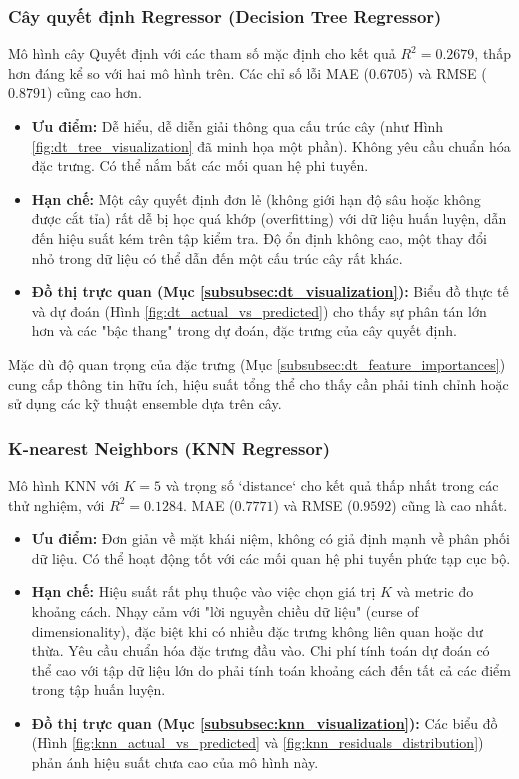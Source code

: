 \subsubsection{Cây quyết định Regressor (Decision Tree Regressor)}
Mô hình cây Quyết định với các tham số mặc định cho kết quả $R^2 = 0.2679$, thấp hơn đáng kể so với hai mô hình trên. Các chỉ số lỗi MAE ($0.6705$) và RMSE ($0.8791$) cũng cao hơn.
\begin{itemize}
    \item \textbf{Ưu điểm:} Dễ hiểu, dễ diễn giải thông qua cấu trúc cây (như Hình \ref{fig:dt_tree_visualization} đã minh họa một phần). Không yêu cầu chuẩn hóa đặc trưng. Có thể nắm bắt các mối quan hệ phi tuyến.
    \item \textbf{Hạn chế:} Một cây quyết định đơn lẻ (không giới hạn độ sâu hoặc không được cắt tỉa) rất dễ bị học quá khớp (overfitting) với dữ liệu huấn luyện, dẫn đến hiệu suất kém trên tập kiểm tra. Độ ổn định không cao, một thay đổi nhỏ trong dữ liệu có thể dẫn đến một cấu trúc cây rất khác.
    \item \textbf{Đồ thị trực quan (Mục \ref{subsubsec:dt_visualization}):} Biểu đồ thực tế và dự đoán (Hình \ref{fig:dt_actual_vs_predicted}) cho thấy sự phân tán lớn hơn và các "bậc thang" trong dự đoán, đặc trưng của cây quyết định.
\end{itemize}
Mặc dù độ quan trọng của đặc trưng (Mục \ref{subsubsec:dt_feature_importances}) cung cấp thông tin hữu ích, hiệu suất tổng thể cho thấy cần phải tinh chỉnh hoặc sử dụng các kỹ thuật ensemble dựa trên cây.

\subsubsection{K-nearest Neighbors (KNN Regressor)}
Mô hình KNN với $K=5$ và trọng số `distance` cho kết quả thấp nhất trong các thử nghiệm, với $R^2 = 0.1284$. MAE ($0.7771$) và RMSE ($0.9592$) cũng là cao nhất.
\begin{itemize}
    \item \textbf{Ưu điểm:} Đơn giản về mặt khái niệm, không có giả định mạnh về phân phối dữ liệu. Có thể hoạt động tốt với các mối quan hệ phi tuyến phức tạp cục bộ.
    \item \textbf{Hạn chế:} Hiệu suất rất phụ thuộc vào việc chọn giá trị $K$ và metric đo khoảng cách. Nhạy cảm với "lời nguyền chiều dữ liệu" (curse of dimensionality), đặc biệt khi có nhiều đặc trưng không liên quan hoặc dư thừa. Yêu cầu chuẩn hóa đặc trưng đầu vào. Chi phí tính toán dự đoán có thể cao với tập dữ liệu lớn do phải tính toán khoảng cách đến tất cả các điểm trong tập huấn luyện.
    \item \textbf{Đồ thị trực quan (Mục \ref{subsubsec:knn_visualization}):} Các biểu đồ (Hình \ref{fig:knn_actual_vs_predicted} và \ref{fig:knn_residuals_distribution}) phản ánh hiệu suất chưa cao của mô hình này.
\end{itemize}

